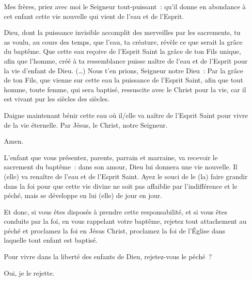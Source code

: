 
Mes frères, priez avec moi le Seigneur tout-puissant~:
qu'il donne en abondance à cet enfant cette vie nouvelle qui
vient de l'eau et de l'Esprit.


Dieu, dont la puissance invisible accomplit des merveilles par
les sacrements, tu as voulu, au cours des temps, que l'eau, ta
créature, révèle ce que serait la grâce du baptême. Que cette
eau reçoive de l'Esprit Saint la grâce de ton Fils unique, afin
que l'homme, créé à ta ressemblance puisse naître de l'eau et de
l'Esprit pour la vie d'enfant de Dieu. (…) Nous t'en prions,
Seigneur notre Dieu : Par la grâce de ton Fils, que vienne sur
cette eau la puissance de l'Esprit Saint, afin que tout homme,
toute femme, qui sera baptisé, ressuscite avec le Christ pour
la vie, car il est vivant pur les siècles des siècles.


Daigne maintenant bénir \grecross{} cette eau où il/elle va naître de
l'Esprit Saint pour vivre de la vie éternelle. Par Jésus,
le Christ, notre Seigneur.

 Amen.

\pars{}


L'enfant que vous présentez, parents, parrain et marraine, va recevoir
le sacrement du baptême~: dans son amour, Dieu lui donnera une vie nouvelle.
Il (elle) va renaître de l'eau et de l'Esprit Saint. Ayez le souci de le
(la) faire grandir dans la foi pour que cette vie divine ne soit pas
affaiblie par l'indifférence et le péché, mais se développe en lui (elle)
de jour en jour.

Et donc, si vous êtes disposés à prendre cette responsabilité, et si vous
êtes conduits par la foi, en vous rappelant votre baptême, rejetez tout
attachement au péché et proclamez la foi en Jésus Christ, proclamez la
foi de l'Église dans laquelle tout enfant est baptisé.

 Pour vivre dans
la liberté des enfants de Dieu, rejetez-vous le péché~?

 Oui, je le rejette.

